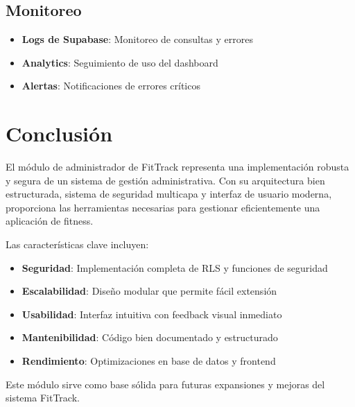 \documentclass[12pt,a4paper]{article}
\begin{document}
	\subsection{Monitoreo}
	
	\begin{itemize}
		\item \textbf{Logs de Supabase}: Monitoreo de consultas y errores
		\item \textbf{Analytics}: Seguimiento de uso del dashboard
		\item \textbf{Alertas}: Notificaciones de errores críticos
	\end{itemize}
	
	\section{Conclusión}
	
	El módulo de administrador de FitTrack representa una implementación robusta y segura de un sistema de gestión administrativa. Con su arquitectura bien estructurada, sistema de seguridad multicapa y interfaz de usuario moderna, proporciona las herramientas necesarias para gestionar eficientemente una aplicación de fitness.
	
	Las características clave incluyen:
	
	\begin{itemize}
		\item \textbf{Seguridad}: Implementación completa de RLS y funciones de seguridad
		\item \textbf{Escalabilidad}: Diseño modular que permite fácil extensión
		\item \textbf{Usabilidad}: Interfaz intuitiva con feedback visual inmediato
		\item \textbf{Mantenibilidad}: Código bien documentado y estructurado
		\item \textbf{Rendimiento}: Optimizaciones en base de datos y frontend
	\end{itemize}
	
	Este módulo sirve como base sólida para futuras expansiones y mejoras del sistema FitTrack.
	
\end{document}
